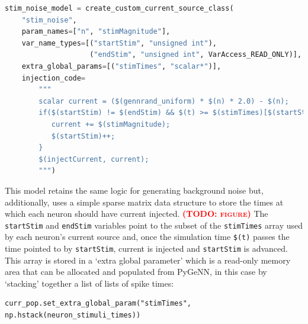 \documentclass[utf8]{frontiersSCNS} %
\newcommand{\todo}[1]{\textbf{\textsc{\textcolor{red}{(TODO: #1)}}}}
\begin{document}
\begin{lstlisting}[language=python]
stim_noise_model = create_custom_current_source_class(
    "stim_noise",
    param_names=["n", "stimMagnitude"],
    var_name_types=[("startStim", "unsigned int"), 
                    ("endStim", "unsigned int", VarAccess_READ_ONLY)],
    extra_global_params=[("stimTimes", "scalar*")],
    injection_code=
        """
        scalar current = ($(gennrand_uniform) * $(n) * 2.0) - $(n);
        if($(startStim) != $(endStim) && $(t) >= $(stimTimes)[$(startStim)]) {
           current += $(stimMagnitude);
           $(startStim)++;
        }
        $(injectCurrent, current);
        """)
\end{lstlisting}
This model retains the same logic for generating background noise but, additionally, uses a simple sparse matrix data structure to store the times at which each neuron should have current injected.
\todo{figure}
The \lstinline{startStim} and \lstinline{endStim} variables point to the subset of the \lstinline{stimTimes} array used by each neuron's current source and, once the simulation time \lstinline{$(t)} passes the time pointed to by \lstinline{startStim}, current is injected and \lstinline{startStim} is advanced.
This array is stored in a `extra global parameter' which is a read-only memory area that can be allocated and populated from PyGeNN, in this case by `stacking' together a list of lists of spike times:
\begin{lstlisting}
curr_pop.set_extra_global_param("stimTimes", np.hstack(neuron_stimuli_times))
\end{lstlisting}
%
\end{document}
